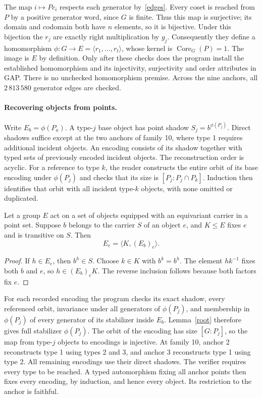 \documentclass[11pt]{article}
\begin{document}
The map $i\mapsto Pc_i$ respects each generator by~\eqref{edges}.
Every coset is reached from $P$ by a positive generator word, since $G$
is finite. Thus this map is surjective; its domain and codomain both have
$n$ elements, so it is bijective. Under this bijection the $r_j$ are
exactly right multiplication by $g_j$. Consequently they define a
homomorphism $\phi:G\to E=\langle r_1,\ldots,r_t\rangle$, whose kernel
is $\operatorname{Core}_G(P)=1$. The image is $E$ by definition.
Only after these checks does the program install the established
homomorphism and its injectivity, surjectivity and order attributes in
GAP. There is no unchecked homomorphism premise. Across the nine anchors,
all $2\,813\,580$ generator edges are checked.

\newpage
\paragraph{Recovering objects from points.}
Write $E_b=\phi(P_a)$. A type-$j$ base object has point shadow
$S_j=b^{\phi(P_j)}$. Direct shadows suffice except at the two anchors
of family 10, where type 1 requires additional incident objects.
An encoding consists of its shadow together with typed sets of previously
encoded incident objects. The reconstruction order is acyclic. For a
reference to type $k$, the reader constructs the entire orbit of its base
encoding under $\phi(P_j)$ and checks that its size is
$[P_j:P_j\cap P_k]$. Induction then identifies that orbit with all
incident type-$k$ objects, with none omitted or duplicated.

\begin{lemma}\label{root}
Let a group $E$ act on a set of objects equipped with an equivariant
carrier in a point set. Suppose $b$ belongs to the carrier $S$ of an
object $e$, and $K\le E$ fixes $e$ and is transitive on $S$. Then
\[
 E_e=\langle K,(E_b)_e\rangle.
\]
\end{lemma}
\begin{proof}
If $h\in E_e$, then $b^h\in S$. Choose $k\in K$ with $b^k=b^h$.
The element $hk^{-1}$ fixes both $b$ and $e$, so $h\in(E_b)_eK$.
The reverse inclusion follows because both factors fix $e$.
\end{proof}

For each recorded encoding the program checks its exact shadow, every
referenced orbit, invariance under all generators of $\phi(P_j)$, and
membership in $\phi(P_j)$ of every generator of its stabilizer inside
$E_b$. Lemma~\ref{root} therefore gives full stabilizer $\phi(P_j)$.
The orbit of the encoding has size $[G:P_j]$, so the map from type-$j$
objects to encodings is injective. At family 10, anchor 2 reconstructs
type 1 using types 2 and 3, and anchor 3 reconstructs type 1 using type 2.
All remaining encodings use their direct shadows. The verifier requires
every type to be reached. A typed automorphism fixing all anchor points
then fixes every encoding, by induction, and hence every object. Its
restriction to the anchor is faithful.
\end{document}

